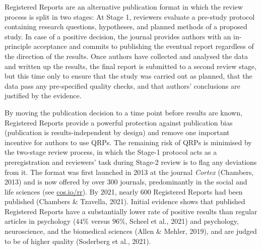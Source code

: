 \documentclass[british,,doc,mask,floatsintext]{apa6}
\begin{document}
Registered Reports are an alternative publication format in which the review process is split in two stages:
At Stage 1, reviewers evaluate a pre-study protocol containing research questions, hypotheses, and planned methods of a proposed study.
In case of a positive decision, the journal provides authors with an in-principle acceptance and commits to publishing the eventual report regardless of the direction of the results.
Once authors have collected and analysed the data and written up the results, the final report is submitted to a second review stage, but this time only to ensure that the study was carried out as planned, that the data pass any pre-specified quality checks, and that authors' conclusions are justified by the evidence.

By moving the publication decision to a time point before results are known, Registered Reports provide a powerful protection against publication bias (publication is results-independent by design) and remove one important incentive for authors to use QRPs.
The remaining risk of QRPs is minimised by the two-stage review process, in which the Stage-1 protocol acts as a preregistration and reviewers' task during Stage-2 review is to flag any deviations from it.
The format was first launched in 2013 at the journal \emph{Cortex} (Chambers, 2013) and is now offered by over 300 journals, predominantly in the social and life sciences (see \url{cos.io/rr}).
By 2021, nearly 600 Registered Reports had been published (Chambers \& Tzavella, 2021).
Initial evidence shows that published Registered Reports have a substantially lower rate of positive results than regular articles in psychology (\(44\%\) versus \(96\%\), Scheel et al., 2021) and psychology, neuroscience, and the biomedical sciences (Allen \& Mehler, 2019), and are judged to be of higher quality (Soderberg et al., 2021).
\end{document}
